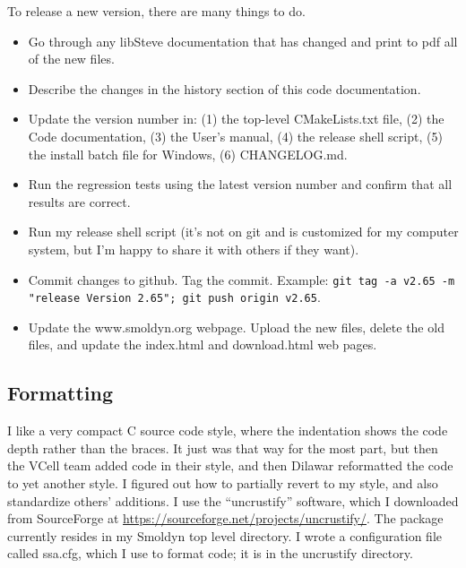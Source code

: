 \documentclass {scrbook}
\newcommand {\ttt} {\texttt}
\begin{document}
To release a new version, there are many things to do.
\begin{itemize}

\item Go through any libSteve documentation that has changed and print to pdf all of the new files.

\item Describe the changes in the history section of this code documentation.

\item Update the version number in: (1) the top-level CMakeLists.txt file, (2) the Code documentation, (3) the User's manual, (4) the release shell script, (5) the install batch file for Windows, (6) CHANGELOG.md.

\item Run the regression tests using the latest version number and confirm that all results are correct.

\item Run my release shell script (it's not on git and is customized for my computer system, but I'm happy to share it with others if they want).

\item Commit changes to github. Tag the commit. Example: \ttt{git tag -a v2.65 -m "release Version 2.65"; git push origin v2.65}.

\item Update the www.smoldyn.org webpage. Upload the new files, delete the old files, and update the index.html and download.html web pages.

\end{itemize}


\subsection{Formatting}

I like a very compact C source code style, where the indentation shows the code depth rather than the braces. It just was that way for the most part, but then the VCell team added code in their style, and then Dilawar reformatted the code to yet another style. I figured out how to partially revert to my style, and also standardize others' additions. I use the ``uncrustify'' software, which I downloaded from SourceForge at \url{https://sourceforge.net/projects/uncrustify/}. The package currently resides in my Smoldyn top level directory. I wrote a configuration file called ssa.cfg, which I use to format code; it is in the uncrustify directory.
\end{document}
